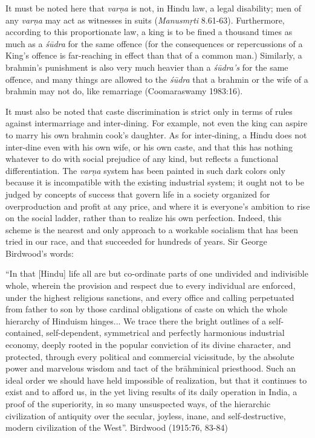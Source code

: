It must be noted here that {\sl varṇa} is not, in Hindu law, a legal disability; men of any {\sl varṇa} may act as witnesses in suits ({\sl Manusmṛti} 8.61-63). Furthermore, according to this proportionate law, a king is to be fined a thousand times as much as a {\sl śūdra} for the same offence (for the consequences or repercussions of a King’s offence is far-reaching in effect than that of a common man.) Similarly, a brahmin’s punishment is also very much heavier than a {\sl śūdra’s} for the same offence, and many things are allowed to the {\sl śūdra} that a brahmin or the wife of a brahmin may not do, like remarriage (Coomaraswamy 1983:16). 

It must also be noted that caste discrimination is strict only in terms of rules against intermarriage and inter-dining. For example, not even the king can aspire to marry his own brahmin cook’s daughter. As for inter-dining, a Hindu does not inter-dine even with his own wife, or his own caste, and that this has nothing whatever to do with social prejudice of any kind, but reflects a functional differentiation. The {\sl varṇa} system has been painted in such dark colors only because it is incompatible with the existing industrial system; it ought not to be judged by concepts of success that govern life in a society organized for overproduction and profit at any price, and where it is everyone’s ambition to rise on the social ladder, rather than to realize his own perfection. Indeed, this scheme is the nearest and only approach to a workable socialism that has been tried in our race, and that succeeded for hundreds of years. Sir George Birdwood’s words: 

\begin{myquote}
“In that [Hindu] life all are but co-ordinate parts of one undivided and indivisible whole, wherein the provision and respect due to every individual are enforced, under the highest religious sanctions, and every office and calling perpetuated from father to son by those cardinal obligations of caste on which the whole hierarchy of Hinduism hinges... We trace there the bright outlines of a self-contained, self-dependent, symmetrical and perfectly harmonious industrial economy, deeply rooted in the popular conviction of its divine character, and protected, through every political and commercial vicissitude, by the absolute power and marvelous wisdom and tact of the brāhminical priesthood. Such an ideal order we should have held impossible of realization, but that it continues to exist and to afford us, in the yet living results of its daily operation in India, a proof of the superiority, in so many unsuspected ways, of the hierarchic civilization of antiquity over the secular, joyless, inane, and self-destructive, modern civilization of the West”.
\hfill Birdwood (1915:76, 83-84)
\end{myquote}

